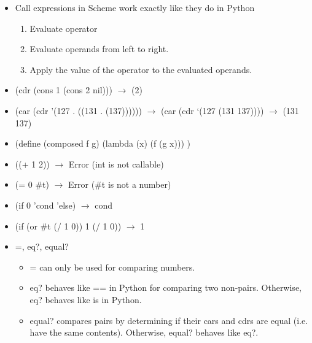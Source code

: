 \documentclass{article}
\begin{document}
\begin{itemize}
	\item Call expressions in Scheme work exactly like they do in Python
	\begin{enumerate}
		\item Evaluate operator
		\item Evaluate operands from left to right.
		\item Apply the value of the operator to the evaluated operands.
	\end{enumerate}
	\item (cdr (cons 1 (cons 2 nil))) $\longrightarrow$ (2)
	\item (car (cdr '(127 . ((131 . (137)))))) $\longrightarrow$
	(car (cdr ‘(127 (131 137)))) $\longrightarrow$ (131 137)
	\item (define (composed f g) (lambda (x) (f (g x))) )
	\item ((+ 1 2)) $\longrightarrow$ Error (int is not callable)
	\item (= 0 \#t) $\longrightarrow$ Error (\#t is not a number)
	\item (if 0 'cond 'else) $\longrightarrow$ cond
	\item (if (or \#t (/ 1 0)) 1 (/ 1 0)) $\longrightarrow$ 1
	\item =, eq?, equal?
	\begin{itemize}
		\item = can only be used for comparing numbers.
		\item eq? behaves like == in Python for comparing two {\color{red} non-pairs}. Otherwise, eq? behaves like is in Python.
		\item equal? compares pairs by determining if their cars and cdrs are equal (i.e. have the same contents). Otherwise, equal? behaves like eq?.
	\end{itemize}

\end{itemize}
\end{document}
